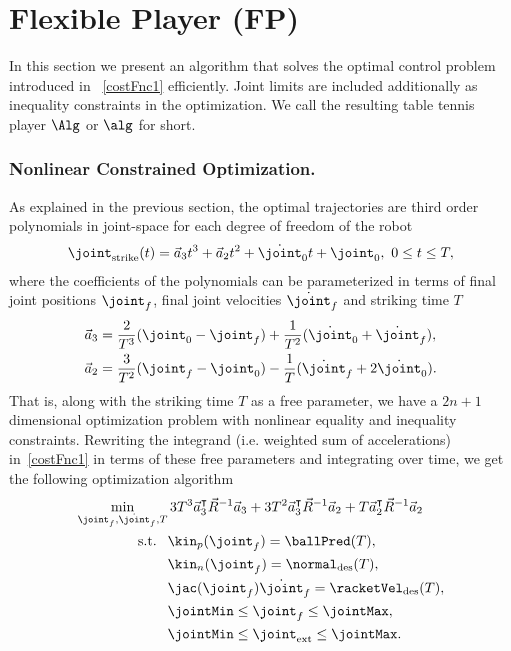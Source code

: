 \section{Flexible Player (FP)}\label{method}

In this section we present an algorithm that solves the optimal control problem introduced in ~\eqref{costFnc1} efficiently. Joint limits are included additionally as inequality constraints in the optimization. We call the resulting table tennis player $\Alg$ or $\alg$ for short. %
%
\subsubsection*{\textbf{Nonlinear Constrained Optimization}.} As explained in the previous section, the optimal trajectories are third order polynomials in joint-space for each degree of freedom of the robot
%
\begin{align}
\joint_{\mathrm{strike}}(t) = \vec{a}_3 t^3  + \vec{a}_2 t^2 + \dot{\joint}_0 t + \joint_0, \ 0 \leq t \leq T,
\end{align}
%
\noindent where the coefficients of the polynomials can be parameterized in terms of final joint positions $\joint_f$, final joint velocities $\dot{\joint}_f$ and striking time $T$
%
\begin{align}
\vec{a}_3 &= \frac{2}{T^3}(\joint_0 - \joint_f) + \frac{1}{T^2}(\dot{\joint}_0 + \dot{\joint}_f), \\
\vec{a}_2 &= \frac{3}{T^2}(\joint_f - \joint_0) - \frac{1}{T}(\dot{\joint}_f + 2\dot{\joint}_0).
\label{coeffs}
\end{align}
%
That is, along with the striking time $T$ as a free parameter, we have a $2n+1$ dimensional optimization problem with nonlinear equality and inequality constraints. Rewriting the integrand (i.e. weighted sum of accelerations) in~\eqref{costFnc1} in terms of these free parameters and integrating over time, we get the following optimization algorithm
%
\begin{align}
\min_{\joint_f,\dot{\joint}_f, T} & \, 3T^3 \vec{a}_3^{\intercal}\vec{R}^{-1}\vec{a}_3 + 3T^2 \vec{a}_3^{\intercal}\vec{R}^{-1}\vec{a}_2 + T\vec{a}_2^{\intercal}\vec{R}^{-1}\vec{a}_2 \label{costFnc3} \\
\textrm{s.t. \ }
& \kin_p(\joint_f) = \ballPred(T), \\
& \kin_n(\joint_f) = \normal_{\mathrm{des}}(T), \\
&\jac(\joint_f)\dot{\joint}_f = \racketVel_{\mathrm{des}}(T), \\
& \jointMin \leq \joint_f \leq \jointMax, \label{jointLimPointwise}\\
& \jointMin \leq \joint_{\mathrm{ext}} \leq \jointMax \label{jointLimTraj}.
\end{align}
